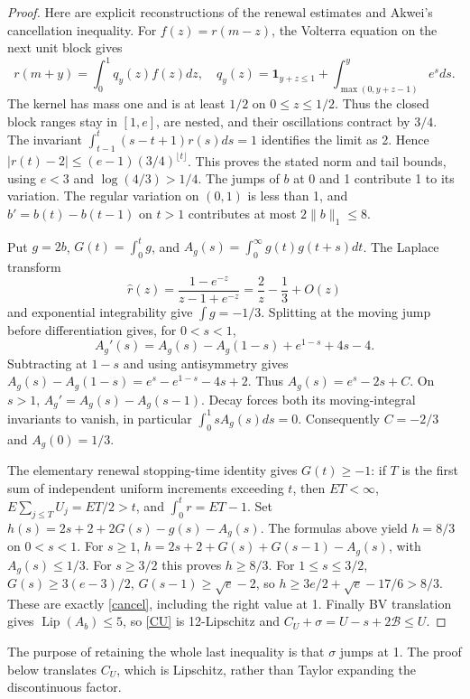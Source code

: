 \begin{proof}
Here are explicit reconstructions of the renewal estimates and Akwei's
cancellation inequality. For \(f(z)=r(m-z)\), the Volterra equation on the
next unit block gives
\[
 r(m+y)=\int_0^1q_y(z)f(z)dz,\quad
 q_y(z)=\mathbf1_{y+z\le1}
 +\int_{\max(0,y+z-1)}^y e^s ds.
\]
The kernel has mass one and is at least \(1/2\) on \(0\le z\le1/2\).
Thus the closed block ranges stay in \([1,e]\), are nested, and their
oscillations contract by \(3/4\). The invariant
\(\int_{t-1}^t(s-t+1)r(s)ds=1\) identifies the limit as 2. Hence
\(|r(t)-2|\le(e-1)(3/4)^{\lfloor t\rfloor}\).
This proves the stated norm and tail bounds, using \(e<3\) and
\(\log(4/3)>1/4\). The jumps of \(b\) at 0 and 1 contribute 1 to its
variation. The regular variation on \((0,1)\) is less than 1, and
\(b'=b(t)-b(t-1)\) on \(t>1\) contributes at most \(2\|b\|_1\le8\).

Put \(g=2b\), \(G(t)=\int_0^t g\), and
\(A_g(s)=\int_0^\infty g(t)g(t+s)dt\).
The Laplace transform
\[
 \widehat r(z)=\frac{1-e^{-z}}{z-1+e^{-z}}
 =\frac2z-\frac13+O(z)
\]
and exponential integrability give \(\int g=-1/3\).
Splitting at the moving jump before differentiation gives, for \(0<s<1\),
\[
 A_g'(s)=A_g(s)-A_g(1-s)+e^{1-s}+4s-4.
\]
Subtracting at \(1-s\) and using antisymmetry gives
\(A_g(s)-A_g(1-s)=e^s-e^{1-s}-4s+2\). Thus
\(A_g(s)=e^s-2s+C\). On \(s>1\), \(A_g'=A_g(s)-A_g(s-1)\).
Decay forces both its moving-integral invariants to vanish, in particular
\(\int_0^1 sA_g(s)ds=0\). Consequently \(C=-2/3\) and \(A_g(0)=1/3\).

The elementary renewal stopping-time identity gives \(G(t)\ge-1\): if
\(T\) is the first sum of independent uniform increments exceeding \(t\),
then \(E T<\infty\), \(E\sum_{j\le T}U_j=E T/2>t\), and
\(\int_0^t r=E T-1\).
Set \(h(s)=2s+2+2G(s)-g(s)-A_g(s)\). The formulas above yield \(h=8/3\)
on \(0<s<1\). For \(s\ge1\),
\(h=2s+2+G(s)+G(s-1)-A_g(s)\), with \(A_g(s)\le1/3\).
For \(s\ge3/2\) this proves \(h\ge8/3\). For \(1\le s\le3/2\),
\(G(s)\ge3(e-3)/2\), \(G(s-1)\ge\sqrt e-2\), so
\(h\ge3e/2+\sqrt e-17/6>8/3\).
These are exactly \eqref{cancel}, including the right value at 1.
Finally BV translation gives \(\operatorname{Lip}(A_b)\le5\), so
\eqref{CU} is 12-Lipschitz and
\(C_U+\sigma=U-s+2\mathcal B\le U\).
\end{proof}

The purpose of retaining the whole last inequality is that \(\sigma\) jumps
at 1. The proof below translates \(C_U\), which is Lipschitz, rather than
Taylor expanding the discontinuous factor.
